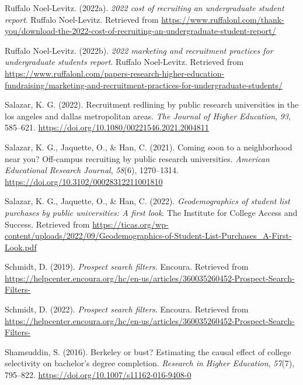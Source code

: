 \documentclass[
  12pt,
]{article}
\newlength{\cslhangindent}
\newlength{\cslentryspacingunit} %
\newenvironment{CSLReferences}[2] %
 {%
  \setlength{\parindent}{0pt}
  \ifodd #1
  \let\oldpar\par
  \def\par{\hangindent=\cslhangindent\oldpar}
  \fi
  \setlength{\parskip}{#2\cslentryspacingunit}
 }%
 {}
\begin{document}
\begin{CSLReferences}{1}{0}
\leavevmode{}%
Ruffalo Noel-Levitz. (2022a). \emph{2022 cost of recruiting an undergraduate student report}. Ruffalo Noel-Levitz. Retrieved from \url{https://www.ruffalonl.com/thank-you/download-the-2022-cost-of-recruiting-an-undergraduate-student-report/}

\leavevmode{}%
Ruffalo Noel-Levitz. (2022b). \emph{2022 marketing and recruitment practices for undergraduate students report}. Ruffalo Noel-Levitz. Retrieved from \url{https://www.ruffalonl.com/papers-research-higher-education-fundraising/marketing-and-recruitment-practices-for-undergraduate-students/}

\leavevmode{}%
Salazar, K. G. (2022). Recruitment redlining by public research universities in the los angeles and dallas metropolitan areas. \emph{The Journal of Higher Education}, \emph{93}, 585--621. \url{https://doi.org/10.1080/00221546.2021.2004811}

\leavevmode{}%
Salazar, K. G., Jaquette, O., \& Han, C. (2021). Coming soon to a neighborhood near you? Off-campus recruiting by public research universities. \emph{American Educational Research Journal}, \emph{58}(6), 1270--1314. \url{https://doi.org/10.3102/00028312211001810}

\leavevmode{}%
Salazar, K. G., Jaquette, O., \& Han, C. (2022). \emph{Geodemographics of student list purchases by public universities: A first look}. {The Institute for College Access and Success}. Retrieved from \url{https://ticas.org/wp-content/uploads/2022/09/Geodemographics-of-Student-List-Purchases_A-First-Look.pdf}

\leavevmode{}%
Schmidt, D. (2019). \emph{Prospect search filters}. Encoura. Retrieved from \url{https://helpcenter.encoura.org/hc/en-us/articles/360035260452-Prospect-Search-Filters-}

\leavevmode{}%
Schmidt, D. (2022). \emph{Prospect search filters}. Encoura. Retrieved from \url{https://helpcenter.encoura.org/hc/en-us/articles/360035260452-Prospect-Search-Filters-}

\leavevmode{}%
Shamsuddin, S. (2016). Berkeley or bust? Estimating the causal effect of college selectivity on bachelor's degree completion. \emph{Research in Higher Education}, \emph{57}(7), 795--822. \url{https://doi.org/10.1007/s11162-016-9408-0}


\end{CSLReferences}
\end{document}
